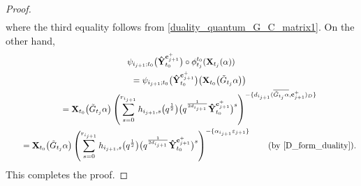 \documentclass[pdftex]{sigma}
\numberwithin{equation}{section}
\begin{document}
\begin{proof}
\begin{gather*}
 \end{gather*}
 where the third equality follows from \eqref{duality_quantum_G_C_matrix1}.
 On the other hand,
 \begin{gather*}
 \psi_{i_{j+1};t_{0}}\bigl(\mathbf{\hat{Y}}_{t_{0}}^{\mathbf{c}_{j+1}^{+}}\bigr)\circ\phi_{t_{j}}^{t_{0}}(\mathbf{X}_{t_{j}}(\alpha))\\
\qquad =\psi_{i_{j+1};t_{0}}\bigl(\mathbf{\hat{Y}}_{t_{0}}^{\mathbf{c}_{j+1}^{+}}\bigr)\bigl(\mathbf{X}_{t_{0}}\bigl(\tilde{G}_{t_{j}}\alpha\bigr)\bigr)\\
\qquad =\mathbf{X}_{t_{0}}\bigl(\tilde{G}_{t_{j}}\alpha\bigr)\left(\sum\limits_{s=0}^{r_{i_{j+1}}} h_{i_{j+1},s}\bigl(q^{\frac{1}{2}}\bigr)\bigl(q^{\frac{1}{2d_{i_{j+1}}}}\mathbf{\hat{Y}}_{t_{0}}^{\mathbf{c}_{j+1}^{+}}\bigr)^{s}\right)^{-\{d_{i_{j+1}}(\overline{\tilde{G}_{t_{j}}\alpha},\mathbf{c}_{j+1}^{+})_D\}}\\
\qquad =\mathbf{X}_{t_{0}}\bigl(\tilde{G}_{t_{j}}\alpha\bigr)\left(\sum\limits_{s=0}^{r_{i_{j+1}}} h_{i_{j+1},s}\bigl(q^{\frac{1}{2}}\bigr)\bigl(q^{\frac{1}{2d_{i_{j+1}}}}\mathbf{\hat{Y}}_{t_{0}}^{\mathbf{c}_{j+1}^{+}}\bigr)^{s}\right)^{-\{\alpha_{i_{j+1}}\varepsilon_{j+1}\}}\qquad\text{(by \eqref{D_form_duality})}.
 \end{gather*}
 This completes the proof.
\end{proof}
\end{document}
